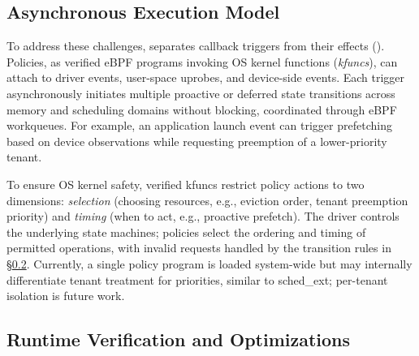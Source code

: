 \subsection{Asynchronous Execution Model}
\label{sec:exec-model}

To address these challenges, \sys{} separates callback triggers from their effects ().
Policies, as verified eBPF programs invoking OS kernel functions (\emph{kfuncs}), can attach to driver events, user-space uprobes, and device-side events.
Each trigger asynchronously initiates multiple proactive or deferred state transitions across memory and scheduling domains without blocking, coordinated through eBPF workqueues.
For example, an application launch event can trigger prefetching based on device observations while requesting preemption of a lower-priority tenant.



To ensure OS kernel safety, verified kfuncs restrict policy actions to two dimensions: \emph{selection} (choosing resources, e.g., eviction order, tenant preemption priority) and \emph{timing} (when to act, e.g., proactive prefetch).
The driver controls the underlying state machines; policies select the ordering and timing of permitted operations, with invalid requests handled by the transition rules in \S\ref{sec:verification}.
Currently, a single policy program is loaded system-wide but may internally differentiate tenant treatment for priorities, similar to sched\_ext; per-tenant isolation is future work.

\subsection{Runtime Verification and Optimizations}
\label{sec:verification}

